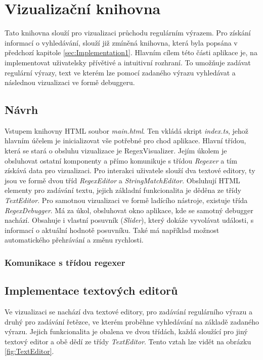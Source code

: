 \chapter{Vizualizační knihovna}\label{sec:Implementation2}

Tato knihovna slouží pro vizualizaci průchodu regulárním výrazem.
Pro získání informací o vyhledávání, slouží již zmíněná knihovna, která byla popsána v předchozí kapitole \ref{sec:Implementation1}.
Hlavním cílem této části aplikace je, na implementovat uživatelsky přívětivé a intuitivní rozhraní.
To umožňuje zadávat regulární výrazy, text ve kterém lze pomocí zadaného výrazu vyhledávat a následnou vizualizaci ve formě debuggeru.


\section{Návrh}

Vstupem knihovny HTML soubor \textit{main.html}.
Ten vkládá skript \textit{index.ts}, jehož hlavním účelem je inicializovat vše potřebné pro chod aplikace.
Hlavní třídou, která se stará o obsluhu vizualizace je RegexVisualizer. 
Jejím úkolem je obsluhovat ostatní komponenty a přímo komunikuje s třídou \textit{Regexer} a tím získává data pro vizualizaci.
Pro interakci uživatele slouží dva textové editory, ty jsou ve formě dvou tříd \textit{RegexEditor} a \textit{StringMatchEditor}.
Obsluhují HTML elementy pro zadávání textu, jejich základní funkcionalita je děděna ze třídy \textit{TextEditor}.
Pro samotnou vizualizaci ve formě ladícího nástroje, existuje třída \textit{RegexDebugger}.
Má za úkol, obsluhovat okno aplikace, kde se samotný debugger nachází.
Obsahuje i vlastní posuvník (\textit{Slider}), který dokáže vyvolávat události, s informací o aktuální hodnotě posuvníku.
Také má například možnost automatického přehrávání a změnu rychlosti.


\subsection*{Komunikace s třídou regexer}


\section{Implementace textových editorů}

Ve vizualizaci se nachází dva textové editory, pro zadávání regulárního výrazu a druhý pro zadávání řetězce, ve kterém proběhne vyhledávání na základě zadaného výrazu.
Jejich funkcionalita je obalena ve dvou třídách, každá sloužící pro jiný textový editor a obě dědí ze třídy \textit{TextEditor}.
Tento vztah lze vidět na obrázku \ref{fig:TextEditor}.

